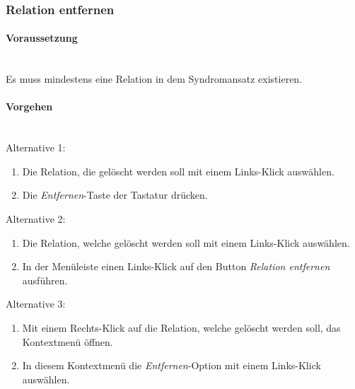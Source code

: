 \documentclass[enabledeprecatedfontcommands,fontsize=11pt,paper=a4,twoside]{scrartcl}
\newcommand*{\condition}{\paragraph{Voraussetzung}$\;$ \vspace{0.2cm}\\}
\newcommand*{\actions}{\paragraph{Vorgehen} $\;$\vspace{0.2cm}\\}
\begin{document}
		\subsubsection{Relation entfernen}
		\condition
		Es muss mindestens eine Relation in dem Syndromansatz existieren. 
		\actions
		Alternative 1:
		\begin{enumerate}
			\item Die Relation, die gelöscht werden soll mit einem Links-Klick auswählen.
			\item Die \textit{Entfernen}-Taste der Tastatur drücken.
		\end{enumerate}
		Alternative 2:
		\begin{enumerate}
			\item Die Relation, welche gelöscht werden soll mit einem Links-Klick auswählen.
			\item In der Menüleiste einen Links-Klick auf den Button \textit{Relation entfernen} ausführen.
		\end{enumerate}
		Alternative 3:
		\begin{enumerate}
			\item Mit einem Rechts-Klick auf die Relation, welche gelöscht werden soll, das Kontextmenü öffnen. 
			\item In diesem Kontextmenü die \textit{Entfernen}-Option mit einem Links-Klick auswählen.
		\end{enumerate}
		
		
\end{document}
